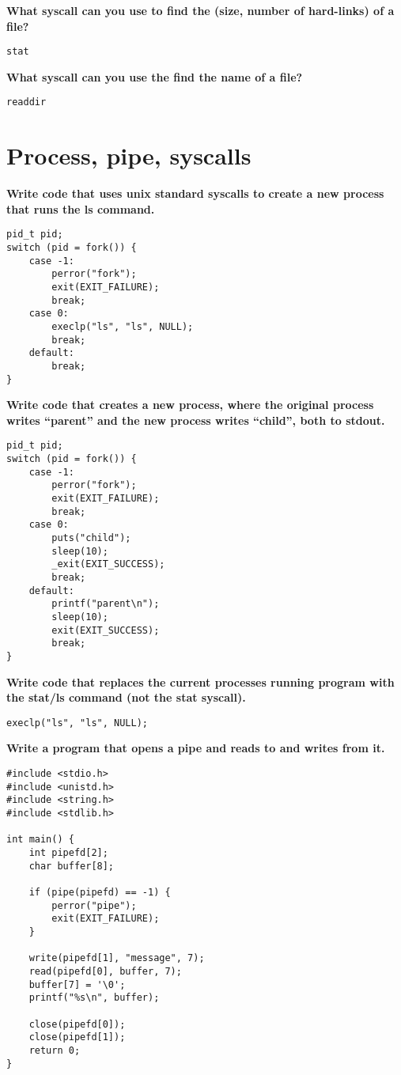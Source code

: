 \documentclass{article}
\begin{document}
\textbf{What syscall can you use to find the (size, number of hard-links) of a file?}

\begin{verbatim}
stat
\end{verbatim}

\textbf{What syscall can you use the find the name of a file?}

\begin{verbatim}
readdir
\end{verbatim}

\section*{Process, pipe, syscalls}
\textbf{Write code that uses unix standard syscalls to create a new process that runs the ls
command.}

\begin{verbatim}
pid_t pid;
switch (pid = fork()) {
    case -1:
        perror("fork");
        exit(EXIT_FAILURE);
        break;
    case 0:
        execlp("ls", "ls", NULL);
        break;
    default:
        break;
}
\end{verbatim}

\textbf{Write code that creates a new process, where the original process writes ``parent'' and the
new process writes ``child'', both to stdout.}

\begin{verbatim}
pid_t pid;
switch (pid = fork()) {
    case -1:
        perror("fork");
        exit(EXIT_FAILURE);
        break;
    case 0:
        puts("child");
        sleep(10);
        _exit(EXIT_SUCCESS);
        break;
    default:
        printf("parent\n");
        sleep(10);
        exit(EXIT_SUCCESS);
        break;
}
\end{verbatim}

\textbf{Write code that replaces the current processes running program with the stat/ls command
(not the stat syscall).}

\begin{verbatim}
execlp("ls", "ls", NULL);
\end{verbatim}

\pagebreak

\textbf{Write a program that opens a pipe and reads to and writes from it.}

\begin{verbatim}
#include <stdio.h>
#include <unistd.h>
#include <string.h>
#include <stdlib.h>

int main() {
    int pipefd[2];
    char buffer[8];

    if (pipe(pipefd) == -1) {
        perror("pipe");
        exit(EXIT_FAILURE);
    }

    write(pipefd[1], "message", 7);
    read(pipefd[0], buffer, 7);
    buffer[7] = '\0';
    printf("%s\n", buffer);

    close(pipefd[0]);
    close(pipefd[1]);
    return 0;
}
\end{verbatim}
\end{document}
